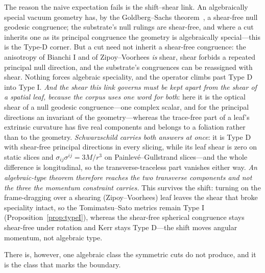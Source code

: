 \documentclass[11pt,a4paper]{article}
\theoremstyle{definition}
\begin{document}
The reason the naive expectation fails is the shift--shear link. An algebraically special vacuum geometry has, by the Goldberg--Sachs theorem~\cite{GoldbergSachs1962}, a shear-free null geodesic congruence; the substrate's null rulings are shear-free, and where a cut inherits one as its principal congruence the geometry is algebraically special---this is the Type-D corner. But a cut need not inherit a shear-free congruence: the anisotropy of Bianchi I and of Zipoy--Voorhees \emph{is} shear, shear forbids a repeated principal null direction, and the substrate's congruences can be reassigned with shear. Nothing forces algebraic speciality, and the operator climbs past Type D into Type I. \emph{And the shear this link governs must be kept apart from the shear of a spatial leaf, because the corpus uses one word for both}: here it is the optical shear of a null geodesic congruence---one complex scalar, and for the principal directions an invariant of the geometry---whereas the trace-free part of a leaf's extrinsic curvature has five real components and belongs to a foliation rather than to the geometry. \emph{Schwarzschild carries both answers at once}: it is Type D with shear-free principal directions in every slicing, while its leaf shear is zero on static slices and $\sigma_{ij}\sigma^{ij}=3M/r^{3}$ on Painlev\'e--Gullstrand slices---and the whole difference is longitudinal, so the transverse-traceless part vanishes either way. \emph{An algebraic-type theorem therefore reaches the two transverse components and not the three the momentum constraint carries.} This survives the shift: turning on the frame-dragging over a shearing (Zipoy--Voorhees) leaf leaves the shear that broke speciality intact, so the Tomimatsu--Sato metrics remain Type I (Proposition~\ref{prop:typeI}), whereas the shear-free spherical congruence stays shear-free under rotation and Kerr stays Type D---the shift moves angular momentum, not algebraic type.

There is, however, one algebraic class the symmetric cuts do not produce, and it is the class that marks the boundary.
\end{document}
